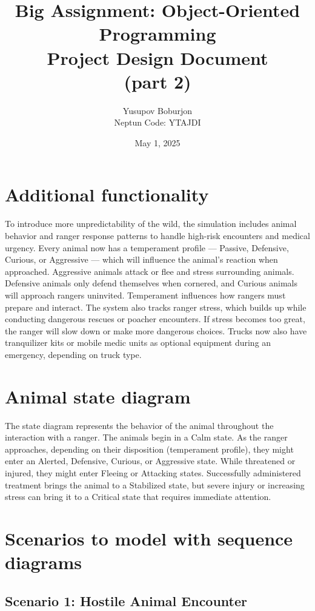 \documentclass[a4paper,12pt]{article}
\title{Big Assignment: Object-Oriented Programming\\\large Project Design Document\\(part 2)}
\author{Yusupov Boburjon\\Neptun Code: YTAJDI}
\date{May 1, 2025}
\begin{document}
\maketitle

\newpage

\section{\textbf{Additional functionality}}

To introduce more unpredictability of the wild, the simulation includes animal behavior and ranger response patterns to handle high-risk encounters and medical urgency.
Every animal now has a temperament profile — Passive, Defensive, Curious, or Aggressive — which will influence the animal’s reaction when approached. Aggressive animals attack or flee and stress surrounding animals. Defensive animals only defend themselves when cornered, and Curious animals will approach rangers uninvited. Temperament influences how rangers must prepare and interact.
The system also tracks ranger stress, which builds up while conducting dangerous rescues or poacher encounters. If stress becomes too great, the ranger will slow down or make more dangerous choices. Trucks now also have tranquilizer kits or mobile medic units as optional equipment during an emergency, depending on truck type.

\section{\textbf{Animal state diagram}}

The state diagram represents the behavior of the animal throughout the interaction with a ranger. The animals begin in a Calm state. As the ranger approaches, depending on their disposition (temperament profile), they might enter an Alerted, Defensive, Curious, or Aggressive state. While threatened or injured, they might enter Fleeing or Attacking states. Successfully administered treatment brings the animal to a Stabilized state, but severe injury or increasing stress can bring it to a Critical state that requires immediate attention.

\section{\textbf{Scenarios to model with sequence diagrams}}
\subsection{Scenario 1: Hostile Animal Encounter}
\end{document}
